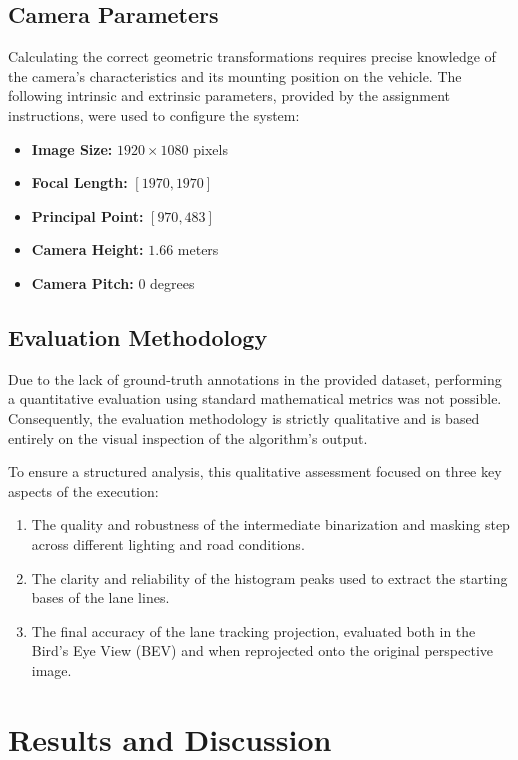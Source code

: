 \documentclass[12pt,a4paper]{article}
\begin{document}
\subsection{Camera Parameters}
Calculating the correct geometric transformations requires precise knowledge of the camera's characteristics and its mounting position on the vehicle. The following intrinsic and extrinsic parameters, provided by the assignment instructions, were used to configure the system:
\begin{itemize}
    \item \textbf{Image Size:} $1920 \times 1080$ pixels
    \item \textbf{Focal Length:} $[1970, 1970]$
    \item \textbf{Principal Point:} $[970, 483]$
    \item \textbf{Camera Height:} $1.66$ meters
    \item \textbf{Camera Pitch:} $0$ degrees
\end{itemize}

\subsection{Evaluation Methodology}
Due to the lack of ground-truth annotations in the provided dataset, performing a quantitative evaluation using standard mathematical metrics was not possible. Consequently, the evaluation methodology is strictly qualitative and is based entirely on the visual inspection of the algorithm's output.

To ensure a structured analysis, this qualitative assessment focused on three key aspects of the execution:
\begin{enumerate}
    \item The quality and robustness of the intermediate binarization and masking step across different lighting and road conditions.
    \item The clarity and reliability of the histogram peaks used to extract the starting bases of the lane lines.
    \item The final accuracy of the lane tracking projection, evaluated both in the Bird's Eye View (BEV) and when reprojected onto the original perspective image.
\end{enumerate}

\section{Results and Discussion}
\end{document}
